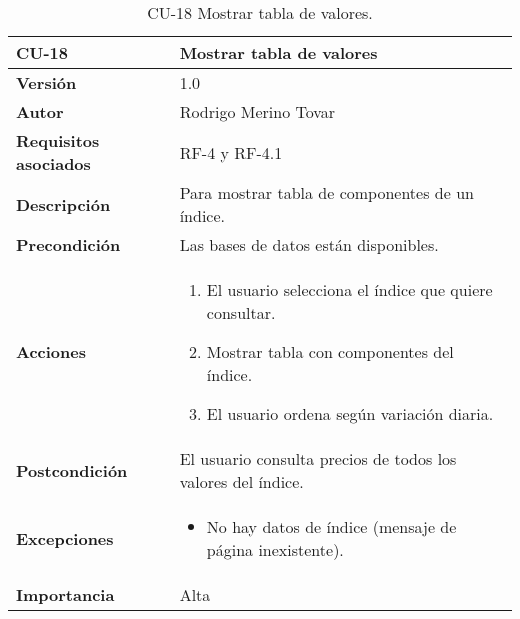 \begin{table}[p]
	\centering
	\begin{tabularx}{\linewidth}{ p{} p{} }
		\toprule
		\textbf{CU-18}    & \textbf{Mostrar tabla de valores}\\
		\toprule
		\textbf{Versión}              & 1.0    \\
		\textbf{Autor}                & Rodrigo Merino Tovar \\
		\textbf{Requisitos asociados} & RF-4 y RF-4.1  \\
		\textbf{Descripción}          & Para mostrar tabla de componentes de un índice.\\
		\textbf{Precondición}         & Las bases de datos están disponibles.  \\
		\textbf{Acciones}             &
		\begin{enumerate}
			\def\labelenumi{\arabic{enumi}.}
			\tightlist
			\item El usuario selecciona el índice que quiere consultar. 
			\item Mostrar tabla con componentes del índice.
			\item El usuario ordena según variación diaria.
		\end{enumerate}\\
		\textbf{Postcondición}        & El usuario consulta precios de todos los valores del índice. \\
		\textbf{Excepciones}          & 
		\begin{itemize}
			\tightlist
			\item No hay datos de índice (mensaje de página inexistente).
		\end{itemize} \\
		\textbf{Importancia}          & Alta \\
		\bottomrule
	\end{tabularx}
	\caption{CU-18 Mostrar tabla de valores.}
\end{table}


